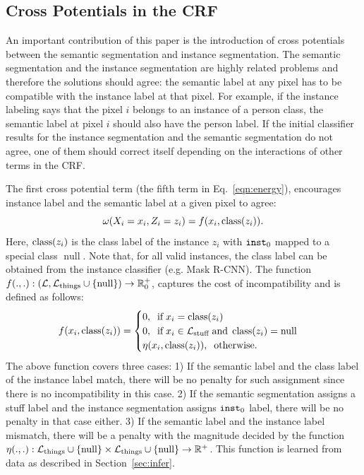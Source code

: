 \subsection{Cross Potentials in the CRF}
An important contribution of this paper is the introduction of cross potentials between the semantic segmentation and instance segmentation. The semantic segmentation and the instance segmentation are highly related problems and therefore the solutions should agree: the semantic label at any pixel has to be compatible with the instance label at that pixel. For example, if the instance labeling says that the pixel $i$ belongs to an instance of a person class, the semantic label at pixel $i$ should also have the person label. If the initial classifier results for the instance segmentation and the semantic segmentation do not agree, one of them should correct itself depending on the interactions of other terms in the CRF.

The first cross potential term (the fifth term in Eq.~\eqref{eqn:energy}), encourages instance label and the semantic label at a given pixel to agree:
\begin{equation}
\omega(X_i = x_i, Z_i = z_i) = f(x_i, \operatorname{class}(z_i)).
\end{equation}
Here, $\operatorname{class}(z_i)$ is the class label of the instance $z_i$ with $\texttt{inst}_0$ mapped to a special class $\operatorname{null}$. Note that, for all valid instances, the class label can be obtained from the instance classifier (e.g. Mask R-CNN). The function $f(., .): (\mathcal{L}, \mathcal{L}_{\operatorname{things}} \cup \{\operatorname{{null}}\}) \to \mathbb{R}^+_0$, captures the cost of incompatibility and is defined as follows: 
\begin{equation}
\label{eqn:cross_compat}
f(x_i, \operatorname{class}(z_i)) = \begin{cases}
0,\;\;\text{if}\;x_i = \operatorname{class}(z_i)\\
0,\;\;\text{if}\;x_i \in \mathcal{L}_{\text{stuff}}\;\text{and}\;\operatorname{class}(z_i) = \operatorname{null}\\
\eta(x_i, \operatorname{class}(z_i)),\;\; \text{otherwise}.
\end{cases}
\end{equation}
The above function covers three cases: 1) If the semantic label and the class label of the instance label match, there will be no penalty for such assignment since there is no incompatibility in this case. 2) If the semantic segmentation assigns a stuff label and the instance segmentation assigns $\texttt{inst}_0$ label, there will be no penalty in that case either. 3) If the semantic label and the instance label mismatch, there will be a penalty with the magnitude decided by the function $\eta(., .): \mathcal{L}_{\operatorname{things}} \cup \{\operatorname{null}\} \times \mathcal{L}_{\operatorname{things}} \cup \{\operatorname{null}\} \to \mathbb{R}^+$. This function is learned from data as described in Section~\ref{sec:infer}.

